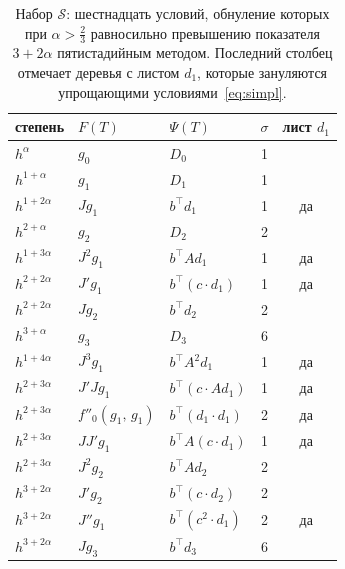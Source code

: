 \begin{table}[ht]
\centering\small
\caption{Набор $\mathcal S$: шестнадцать условий, обнуление которых при $\alpha>\frac23$ равносильно превышению показателя $3+2\alpha$ пятистадийным методом. Последний столбец отмечает деревья с листом $d_1$, которые зануляются упрощающими условиями~\eqref{eq:simpl}.}\label{tab:S}
\begin{tabular}{lllcc}
\toprule
степень & $F(T)$ & $\Psi(T)$ & $\sigma$ & лист $d_1$\\
\midrule
$h^{\alpha}$ & $g_0$ & $D_0$ & 1 & \\
$h^{1+\alpha}$ & $g_{1}$ & $D_{1}$ & 1 & \\
$h^{1+2\alpha}$ & $Jg_{1}$ & $b^{\top}d_{1}$ & 1 & да\\
$h^{2+\alpha}$ & $g_{2}$ & $D_{2}$ & 2 & \\
$h^{1+3\alpha}$ & $J^{2}g_{1}$ & $b^{\top}Ad_{1}$ & 1 & да\\
$h^{2+2\alpha}$ & $J'g_{1}$ & $b^{\top}(c\cdot d_{1})$ & 1 & да\\
$h^{2+2\alpha}$ & $Jg_{2}$ & $b^{\top}d_{2}$ & 2 & \\
$h^{3+\alpha}$ & $g_{3}$ & $D_{3}$ & 6 & \\
$h^{1+4\alpha}$ & $J^{3}g_{1}$ & $b^{\top}A^{2}d_{1}$ & 1 & да\\
$h^{2+3\alpha}$ & $J'Jg_{1}$ & $b^{\top}(c\cdot Ad_{1})$ & 1 & да\\
$h^{2+3\alpha}$ & $f''_{0}(g_{1},\,g_{1})$ & $b^{\top}(d_{1}\cdot d_{1})$ & 2 & да\\
$h^{2+3\alpha}$ & $JJ'g_{1}$ & $b^{\top}A(c\cdot d_{1})$ & 1 & да\\
$h^{2+3\alpha}$ & $J^{2}g_{2}$ & $b^{\top}Ad_{2}$ & 2 & \\
$h^{3+2\alpha}$ & $J'g_{2}$ & $b^{\top}(c\cdot d_{2})$ & 2 & \\
$h^{3+2\alpha}$ & $J''g_{1}$ & $b^{\top}(c^{2}\cdot d_{1})$ & 2 & да\\
$h^{3+2\alpha}$ & $Jg_{3}$ & $b^{\top}d_{3}$ & 6 & \\
\bottomrule
\end{tabular}
\end{table}
